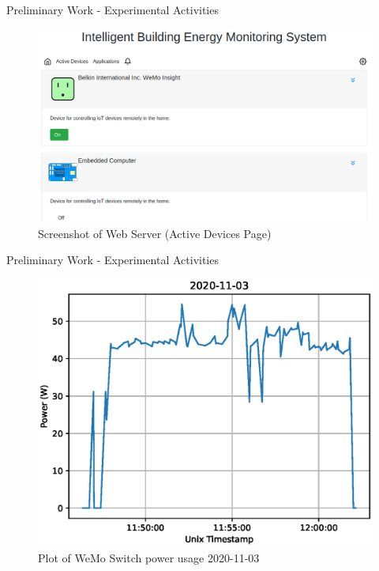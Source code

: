 \documentclass{beamer}
\begin{document}
\begin{frame}{Preliminary Work - Experimental Activities}{}
    \begin{figure}
        \centering
        \includegraphics[scale=0.3]{figs/webServer/activeDevicesWithEmbeddedPicture.png}
        \caption{Screenshot of Web Server (Active Devices Page)}
        \label{fig:my_label}
    \end{figure}
\end{frame}

\begin{frame}{Preliminary Work - Experimental Activities}{}
    \begin{figure}
        \centering
        \includegraphics[scale=0.5]{figs/powerPlot2020-11-03.eps}
        \caption{Plot of WeMo Switch power usage 2020-11-03}
        \label{fig:powerPlotWeMoSwitch}
    \end{figure}
\end{frame}
\end{document}
